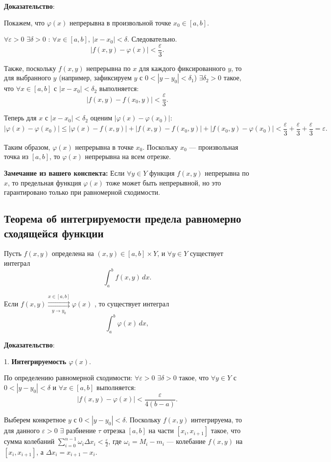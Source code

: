 \documentclass{article}
\begin{document}
\textbf{Доказательство}:

Покажем, что $\varphi(x)$ непрерывна в произвольной точке $x_0 \in [a, b]$.

$\forall \varepsilon > 0$ $\exists \delta > 0$ : $\forall x \in [a, b]$, $|x - x_0| < \delta$.
Следовательно.
\[
|f(x, y) - \varphi(x)| < \frac{\varepsilon}{3}.
\]

Также, поскольку $f(x, y)$ непрерывна по $x$ для каждого фиксированного $y$, то для выбранного $y$ (например, зафиксируем $y$ с $0 < |y - y_0| < \delta_1$) $\exists \delta_2 > 0$ такое, что $\forall x \in [a, b]$ с $|x - x_0| < \delta_2$ выполняется:
\[
|f(x, y) - f(x_0, y)| < \frac{\varepsilon}{3}.
\]

Теперь для $x$ с $|x - x_0| < \delta_2$ оценим $|\varphi(x) - \varphi(x_0)|$:
\[
|\varphi(x) - \varphi(x_0)| \leq |\varphi(x) - f(x, y)| + |f(x, y) - f(x_0, y)| + |f(x_0, y) - \varphi(x_0)| < \frac{\varepsilon}{3} + \frac{\varepsilon}{3} + \frac{\varepsilon}{3} = \varepsilon.
\]

Таким образом, $\varphi(x)$ непрерывна в точке $x_0$. Поскольку $x_0$ — произвольная точка из $[a, b]$, то $\varphi(x)$ непрерывна на всем отрезке.

\textbf{Замечание из вашего конспекта:} Если $\forall y \in Y$ функция $f(x, y)$ непрерывна по $x$, то предельная функция $\varphi(x)$ тоже может быть непрерывной, но это гарантировано только при равномерной сходимости.


\subsection*{Теорема об интегрируемости предела равномерно сходящейся функции}

Пусть $f(x, y)$ определена на $(x, y) \in [a, b] \times Y$, и $\forall y \in Y$ существует интеграл
\[
\int_a^b f(x, y) \, dx.
\]

Если $f(x, y) \mathop{\rightrightarrows}\limits^{x \in [a,b]}_{\,y \to y_0\,} \varphi(x)$ , то существует интеграл
\[
\int_a^b \varphi(x) \, dx,
\]

\textbf{Доказательство}:

1. \textbf{Интегрируемость $\varphi(x)$}.

По определению равномерной сходимости: $\forall \varepsilon > 0$ $\exists \delta > 0$ такое, что $\forall y \in Y$ с $0 < |y - y_0| < \delta$ и $\forall x \in [a, b]$ выполняется:
\[
|f(x, y) - \varphi(x)| < \frac{\varepsilon}{4(b-a)}.
\]

Выберем конкретное $y$ с $0 < |y - y_0| < \delta$. Поскольку $f(x, y)$ интегрируема, то для данного $\varepsilon > 0$ $\exists$ разбиение $\tau$ отрезка $[a, b]$ на части $[x_i, x_{i+1}]$ такое, что сумма колебаний $\sum_{i=0}^{n-1} \omega_i \Delta x_i < \frac{\varepsilon}{2}$, где $\omega_i = M_i - m_i$ — колебание $f(x, y)$ на $[x_i, x_{i+1}]$, а $\Delta x_i = x_{i+1} - x_i$.
\end{document}
